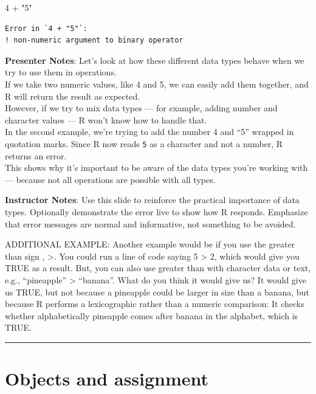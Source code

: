 \documentclass[
  letterpaper,
  DIV=11,
  numbers=noendperiod]{scrartcl}
\newenvironment{Shaded}{\begin{snugshade}}{\end{snugshade}}
\newcommand{\DecValTok}[1]{\textcolor[rgb]{0.68,0.00,0.00}{#1}}
\newcommand{\SpecialCharTok}[1]{\textcolor[rgb]{0.37,0.37,0.37}{#1}}
\newcommand{\StringTok}[1]{\textcolor[rgb]{0.13,0.47,0.30}{#1}}
\begin{document}
\begin{Shaded}
\begin{Highlighting}[]
\DecValTok{4} \SpecialCharTok{+} \StringTok{"5"}
\end{Highlighting}
\end{Shaded}

\begin{verbatim}
Error in `4 + "5"`:
! non-numeric argument to binary operator
\end{verbatim}

\textbf{Presenter Notes}: Let's look at how these different data types
behave when we try to use them in operations.\\
If we take two numeric values, like 4 and 5, we can easily add them
together, and R will return the result as expected.\\
However, if we try to mix data types --- for example, adding number and
character values --- R won't know how to handle that.\\
In the second example, we're trying to add the number 4 and ``5''
wrapped in quotation marks. Since R now reads \texttt{5} as a character
and not a number, R returns an error.\\
This shows why it's important to be aware of the data types you're
working with --- because not all operations are possible with all types.

\textbf{Instructor Notes}: Use this slide to reinforce the practical
importance of data types. Optionally demonstrate the error live to show
how R responds. Emphasize that error messages are normal and
informative, not something to be avoided.

ADDITIONAL EXAMPLE: Another example would be if you use the greater than
sign , \textgreater. You could run a line of code saying 5
\textgreater{} 2, which would give you TRUE as a result. But, you can
also use greater than with character data or text, e.g., ``pineapple''
\textgreater{} ``banana''. What do you think it would give us? It would
give us TRUE, but not because a pineapple could be larger in size than a
banana, but because R performs a lexicographic rather than a numeric
comparison: It checks whether alphabetically pineapple comes after
banana in the alphabet, which is TRUE.

\begin{center}\rule{0.5\linewidth}{0.5pt}\end{center}

\section{Objects and assignment}\label{objects-and-assignment}
\end{document}
